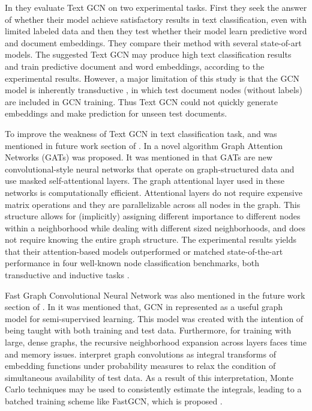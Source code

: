 In \autocite{yao18graph} they evaluate Text GCN on two experimental tasks. First they seek the answer of whether their model achieve satisfactory results in text classification, even with limited labeled data and then they test whether their model learn predictive word and document embeddings. They compare their method with several state-of-art models. The suggested Text GCN may produce high text classification results and train predictive document and word embeddings, according to the experimental results. However, a major limitation of this study is that the GCN model is inherently transductive \autocite{yao18graph}, in which test document nodes (without labels) are included in GCN training. Thus Text GCN could not quickly generate embeddings and make prediction for unseen test documents.

To improve the weakness of Text GCN in text classification task, \autocite{velickovic18graph} and \autocite{fastGCN2018} was mentioned in future work section of \autocite{yao18graph}. In \autocite{velickovic18graph} a novel algorithm Graph Attention Networks (GATs) was proposed. It was mentioned in \autocite{velickovic18graph} that GATs are new convolutional-style neural networks that operate on graph-structured data and use masked self-attentional layers. The graph attentional layer used in these networks is computationally efficient. Attentional layers do not require expensive matrix operations and they are parallelizable across all nodes in the graph. This structure allows for (implicitly) assigning different importance to different nodes within a neighborhood while dealing with different sized neighborhoods, and does not require knowing the entire graph structure. The experimental results yields that their attention-based models outperformed or matched state-of-the-art performance in four well-known node classification benchmarks, both transductive and inductive tasks \autocite{velickovic18graph}.

Fast Graph Convolutional Neural Network \autocite{fastGCN2018} was also mentioned in the future work section of \autocite{yao18graph}. In \autocite{fastGCN2018} it was mentioned that, GCN in \autocite{kipf17semisupervised} represented as a useful graph model for semi-supervised learning. This model was created with the intention of being taught with both training and test data. Furthermore, for training with large, dense graphs, the recursive neighborhood expansion across layers faces time and memory issues. \autocite{fastGCN2018} interpret graph convolutions as integral transforms of embedding functions under probability measures to relax the condition of simultaneous availability of test data. As a result of this interpretation, Monte Carlo techniques may be used to consistently estimate the integrals, leading to a batched training scheme like FastGCN, which is proposed \cite{fastGCN2018}.

